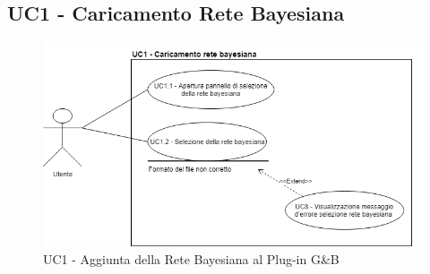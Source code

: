 \subsection{UC1 - Caricamento Rete Bayesiana}\label{UC1}
\begin{figure}[H]
	\begin{center}
		\includegraphics[scale=0.5]{./images/UC1.png}
		 \caption{UC1 - Aggiunta della Rete Bayesiana al Plug-in G\&B}
	\end{center}
\end{figure}


